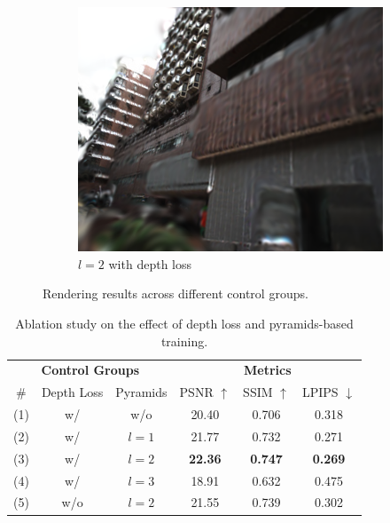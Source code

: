 \documentclass[lettersize,journal]{IEEEtran}
\begin{document}
\begin{figure}
\begin{subfigure}{0.15\textwidth}
        \label{fig:ablationwd3}
    \end{subfigure}
    \hspace{0.0001\textwidth} %
    \begin{subfigure}{0.15\textwidth}
        \includegraphics[width=\linewidth]{image/ablation/wd2.png}
        \caption{$l=2$ with depth loss}
        \label{fig:ablationwd2}
    \end{subfigure}
    \hspace{0.0001\textwidth} %
    \caption{Rendering results across different control groups.}
    \label{fig:ablation}
\end{figure}

\begin{table}
    \raggedright %
    \renewcommand{\arraystretch}{1.0} %
    \setlength{\tabcolsep}{9pt} %
    \caption{Ablation study on the effect of depth loss and pyramids-based training.}
    \label{tab:ablation}
    \begin{tabular}{@{}cccccc@{}}
        \toprule
        \multicolumn{3}{c}{\textbf{Control Groups}} & \multicolumn{3}{c}{\textbf{Metrics}} \\
        \cmidrule(lr){1-3} \cmidrule(lr){4-6}
        \# & Depth Loss & Pyramids & PSNR $\uparrow$ & SSIM $\uparrow$ & LPIPS $\downarrow$ \\
        \midrule
        (1) & w/ & w/o & 20.40 & 0.706 & 0.318 \\
        (2) & w/ & $l=1$ & 21.77 & 0.732 & 0.271 \\
        (3) & w/ & $l=2$ & \textbf{22.36} & \textbf{0.747} & \textbf{0.269} \\
        (4) & w/ & $l=3$ & 18.91 & 0.632 & 0.475 \\
        (5) & w/o & $l=2$ & 21.55 & 0.739 & 0.302 \\
        \bottomrule
    \end{tabular}
    \captionsetup{justification=centering, labelsep=colon} %
\end{table}
\end{document}
